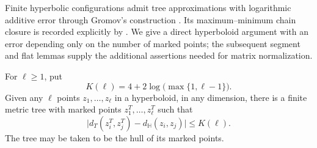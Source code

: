 Finite hyperbolic configurations admit tree approximations with
logarithmic additive error through Gromov's construction
\citep{Gromov1987Hyperbolic}. Its maximum--minimum chain closure is
recorded explicitly by \citet[Section~2, equation~(11)]{CornectMartinezPedroza2025Tree}.
We give a direct hyperboloid argument with an error depending only on
the number of marked points; the subsequent segment and flat lemmas
supply the additional assertions needed for matrix normalization.

\begin{lemma}\label{mt:finite-metric}
For \(\ell\ge1\), put
\[
 K(\ell)=4+2\log\bigl(\max\{1,\ell-1\}\bigr).
\]
Given any \(\ell\) points \(z_1,\ldots,z_\ell\) in a hyperboloid, in any
dimension, there is a finite metric tree with marked points
\(z_1^T,\ldots,z_\ell^T\) such that
\begin{equation}\label{mt:endpoint-error}
 \bigl|d_T(z_i^T,z_j^T)-d_{\mathbb H}(z_i,z_j)\bigr|\le K(\ell).
\end{equation}
The tree may be taken to be the hull of its marked points.
\end{lemma}
